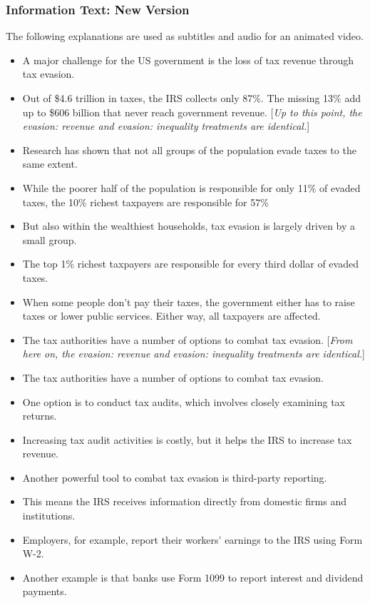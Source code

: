\documentclass[11pt]{article}
\begin{document}
\subsubsection*{Information Text: New Version}
The following explanations are used as subtitles and audio for an animated video.
\begin{itemize}
\item A major challenge for the US government is the loss of tax revenue through tax evasion.
\item Out of \$4.6 trillion in taxes, the IRS collects only 87\%. The missing 13\% add up to \$606 billion that never reach government revenue. [\textit{Up to this point, the evasion: revenue and evasion: inequality treatments are identical.}]
\item Research has shown that not all groups of the population evade taxes to the same extent. 
\item While the poorer half of the population is responsible for only 11\% of evaded taxes, the 10\% richest taxpayers are responsible for 57\% 
\item But also within the wealthiest households, tax evasion is largely driven by a small group. 
\item The top 1\% richest taxpayers are responsible for every third dollar of evaded taxes.  
\item When some people don’t pay their taxes, the government either has to raise taxes or lower public services. Either way, all taxpayers are affected.
\item The tax authorities have a number of options to combat tax evasion. [\textit{From here on, the evasion: revenue and evasion: inequality treatments are identical.}]
\item The tax authorities have a number of options to combat tax evasion.
\item One option is to conduct tax audits, which involves closely examining tax returns.
\item Increasing tax audit activities is costly, but it helps the IRS to increase tax revenue.
\item Another powerful tool to combat tax evasion is third-party reporting. 
\item This means the IRS receives information directly from domestic firms and institutions.
\item Employers, for example, report their workers’ earnings to the IRS using Form W-2.
\item Another example is that banks use Form 1099 to report interest and dividend payments. 

\end{itemize}
\end{document}
